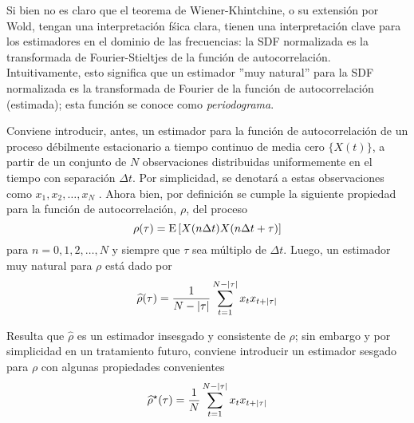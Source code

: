 Si bien no es claro que el teorema de Wiener-Khintchine, o su extensi\'on por Wold, tengan una
interpretaci\'on f\'sica clara, tienen una interpretaci\'on clave para los estimadores en el
dominio de las frecuencias:
la SDF normalizada es la transformada de Fourier-Stieltjes de la 
funci\'on de autocorrelaci\'on.
Intuitivamente, esto significa que un estimador ''muy natural'' para la SDF normalizada
es la transformada de Fourier de la funci\'on de autocorrelaci\'on (estimada);
esta funci\'on se conoce como \textit{periodograma}.

Conviene introducir, antes, un estimador para la funci\'on de autocorrelaci\'on de un proceso
d\'ebilmente estacionario a tiempo continuo de media cero $\{ X(t) \}$, 
a partir de un conjunto de $N$ 
observaciones distribuidas uniformemente en el tiempo con separaci\'on $\Delta t$.
Por simplicidad, se denotar\'a a estas observaciones como $x_1, x_2 , \dots, x_N$ .
Ahora bien, 
por definici\'on se cumple la siguiente propiedad para la funci\'on de autocorrelaci\'on, $\rho$,
del proceso
\begin{equation*}
\rho(\tau)
= \mathrm{E}\left[ X(n\Delta t)X(n\Delta t + \tau) \right]
\end{equation*}
para $n = 0, 1, 2, \dots, N$ y siempre que $\tau$ sea m\'ultiplo de
$\Delta t$. Luego, un estimador muy natural para $\rho$ est\'a dado por
\begin{equation}
\widehat{\rho}(\tau) = \frac{1}{N-\left| \tau \right|} 
\sum_{t = 1}^{N-\left| \tau \right|} x_t x_{t+\left| \tau \right|}
\label{estimador_R}
\end{equation}

Resulta que $\widehat{\rho}$ es un estimador insesgado y consistente de $\rho$;
sin embargo y por simplicidad en un tratamiento futuro, 
conviene introducir un estimador sesgado para $\rho$ con algunas propiedades convenientes
\begin{equation}
\widehat{ \rho }^{\star}(\tau) = \frac{1}{N} 
\sum_{t = 1}^{N-\left| \tau \right|} x_t x_{t+\left| \tau \right|}
\label{estimador_R_ast}
\end{equation}

